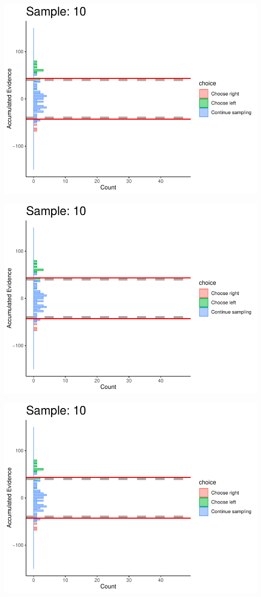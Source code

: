 \documentclass[
]{book}
\begin{document}
\begin{center}\includegraphics[width=0.8\linewidth]{LateNightBayes_files/figure-latex/collapsing_dcb-92} \end{center}

\begin{center}\includegraphics[width=0.8\linewidth]{LateNightBayes_files/figure-latex/collapsing_dcb-93} \end{center}

\begin{center}\includegraphics[width=0.8\linewidth]{LateNightBayes_files/figure-latex/collapsing_dcb-94} \end{center}
\end{document}
